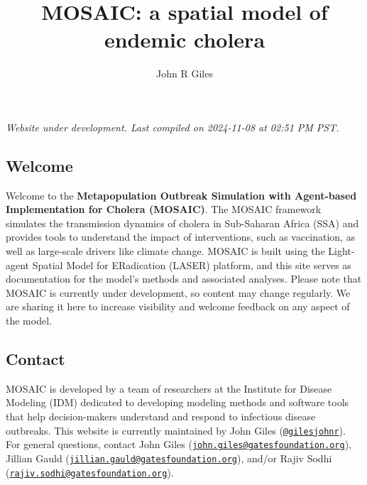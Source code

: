 \documentclass[
]{book}
\title{MOSAIC: a spatial model of endemic cholera}
\author{John R Giles}
\date{}
\begin{document}
\maketitle

{
\setcounter{tocdepth}{1}
\tableofcontents
}
\chapter*{}\label{section}

\hfill\break

{\emph{
Website under development. Last compiled on 2024-11-08 at 02:51 PM PST.
}}

\section*{Welcome}\label{welcome}

Welcome to the \textbf{Metapopulation Outbreak Simulation with Agent-based Implementation for Cholera (MOSAIC)}. The MOSAIC framework simulates the transmission dynamics of cholera in Sub-Saharan Africa (SSA) and provides tools to understand the impact of interventions, such as vaccination, as well as large-scale drivers like climate change. MOSAIC is built using the Light-agent Spatial Model for ERadication (LASER) platform, and this site serves as documentation for the model's methods and associated analyses. Please note that MOSAIC is currently under development, so content may change regularly. We are sharing it here to increase visibility and welcome feedback on any aspect of the model.

\section*{Contact}\label{contact}

MOSAIC is developed by a team of researchers at the Institute for Disease Modeling (IDM) dedicated to developing modeling methods and software tools that help decision-makers understand and respond to infectious disease outbreaks. This website is currently maintained by John Giles (\href{https://github.com/gilesjohnr}{\texttt{@gilesjohnr}}). For general questions, contact John Giles (\href{mailto:john.giles@gatesfoundation.org}{\nolinkurl{john.giles@gatesfoundation.org}}), Jillian Gauld (\href{mailto:jillian.gauld@gatesfoundation.org}{\nolinkurl{jillian.gauld@gatesfoundation.org}}), and/or Rajiv Sodhi (\href{mailto:rajiv.sodhi@gatesfoundation.org}{\nolinkurl{rajiv.sodhi@gatesfoundation.org}}).
\end{document}
